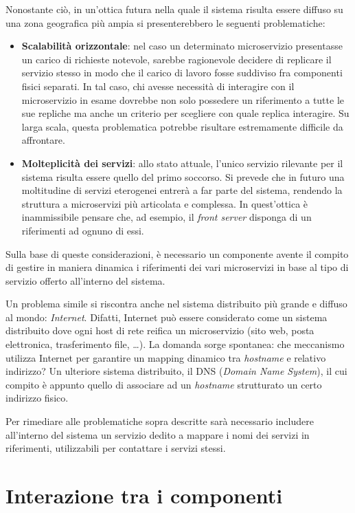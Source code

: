 \documentclass[a4paper,12pt]{report}
\begin{document}
Nonostante ciò, in un'ottica futura nella quale il sistema risulta essere diffuso su una zona geografica più ampia si presenterebbero le seguenti problematiche:
\begin{itemize}
	\item \textbf{Scalabilità orizzontale}: nel caso un determinato microservizio presentasse un carico di richieste notevole, sarebbe ragionevole decidere di replicare il servizio stesso in modo che il carico di lavoro fosse suddiviso fra componenti fisici separati. In tal caso, chi avesse necessità di interagire con il microservizio in esame dovrebbe non solo possedere un riferimento a tutte le sue repliche ma anche un criterio per scegliere con quale replica interagire. Su larga scala, questa problematica potrebbe risultare estremamente difficile da affrontare.
	\item \textbf{Molteplicità dei servizi}: allo stato attuale, l'unico servizio rilevante per il sistema risulta essere quello del primo soccorso. Si prevede che in futuro una moltitudine di servizi eterogenei entrerà a far parte del sistema, rendendo la struttura a microservizi più articolata e complessa. In quest'ottica è inammissibile pensare che, ad esempio, il \emph{front server} disponga di un riferimenti ad ognuno di essi. 
\end{itemize}

Sulla base di queste considerazioni, è necessario un componente avente il compito di gestire in maniera dinamica i riferimenti dei vari microservizi in base al tipo di servizio offerto all'interno del sistema. 

Un problema simile si riscontra anche nel sistema distribuito più grande e diffuso al mondo: \emph{Internet}. Difatti, Internet può essere considerato come un sistema distribuito dove ogni host di rete reifica un microservizio (sito web, posta elettronica, trasferimento file, \dots). La domanda sorge spontanea: che meccanismo utilizza Internet per garantire un mapping dinamico tra \emph{hostname} e relativo indirizzo? Un ulteriore sistema distribuito, il DNS (\emph{Domain Name System}), il cui compito è appunto quello di associare ad un \emph{hostname} strutturato un certo indirizzo fisico.

Per rimediare alle problematiche sopra descritte sarà necessario includere all'interno del sistema un servizio dedito a mappare i nomi dei servizi in riferimenti, utilizzabili per contattare i servizi stessi.

\section{Interazione tra i componenti} \label{components_interaction}
\end{document}
